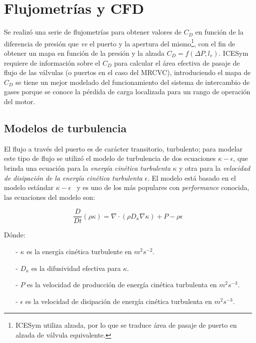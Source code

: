 \section{Flujometrías y CFD}
%
Se realizó una serie de flujometrías para obtener valores de $C_{D}$ en función
de la diferencia de presión que \emph{ve} el puerto y la apertura del
mismo\footnote{ICESym utiliza alzada, por lo que se traduce área de pasaje de
puerto en alzada de válvula equivalente.}, con el fin de obtener un mapa en
función de la presión y la alzada $C_{D} = f(\Delta P,l_v)$.
%
ICESym requiere de información sobre el $C_{D}$ para calcular el área efectiva
de pasaje de flujo de las válvulas (o puertos en el caso del MRCVC),
introduciendo el mapa de $C_{D}$ se tiene un mejor modelado del funcionamiento
del sistema de intercambio de gases porque se conoce la pérdida de carga
localizada para un rango de operación del motor.

\subsection{Modelos de turbulencia}
%
El flujo a través del puerto es de carácter transitorio, turbulento; para
modelar este tipo de flujo se utilizó el modelo de turbulencia de dos ecuaciones
\emph{$\kappa-\epsilon$}\parencite{wilcox}, que brinda una ecuación para la
\emph{energía cinética turbulenta} $\kappa$ y otra para la \emph{velocidad de
disipación de la energía cinética turbulenta} $\epsilon$.
%
El modelo está basado en el modelo estándar
$\kappa-\epsilon$~\parencite{launderSpalding} y es uno de los más populares con
\emph{performance} conocida, las ecuaciones del modelo son:

\begin{equation}\label{eq:k}
  \frac{D}{Dt}(\rho \kappa) = \nabla \cdot (\rho D_{\kappa}\nabla \kappa) + P - \rho \epsilon
\end{equation}

Dónde:
\begin{itemize}
  \item[-] $\kappa$ es la energía cinética turbulente en $m^{2}s^{-2}$.
  \item[-] $D_{\kappa}$ es la difusividad efectiva para $\kappa$.
  \item[-] $P$ es la velocidad de producción de energía cinética turbulenta en $m^{2}s^{-3}$.
  \item[-] $\epsilon$ es la velocidad de disipación de energía cinética turbulenta en $m^{2}s^{-3}$.
\end{itemize}


